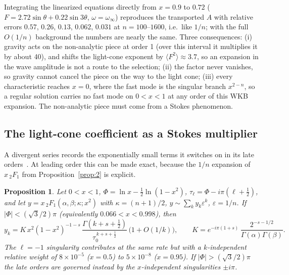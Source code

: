 \documentclass[aps,prd,onecolumn,superscriptaddress,nofootinbib,10pt]{revtex4-2}
\newcommand{\eps}{\varepsilon}
\newtheorem{proposition}{Proposition}
\begin{document}
Integrating the linearized equations directly from $x = 0.9$ to $0.72$ ($F = 2.72\sin\theta + 0.22\sin3\theta$,
$\omega = \omega_\infty$) reproduces the transported $A$ with relative errors $0.57$, $0.26$, $0.13$, $0.062$, $0.031$ at
$n = 100$--$1600$, i.e.\ like $1/n$; with the full $O(1/n)$ background the numbers are nearly the same. Three
consequences: (i) gravity acts on the non-analytic piece at order 1 (over this interval it multiplies it by about 40),
and shifts the light-cone exponent by $\langle F^2\rangle \approx 3.7$, so an expansion in the wave amplitude is not a route
to the selection; (ii) the factor never vanishes, so gravity cannot cancel the piece on the way to the light cone;
(iii) every characteristic reaches $x = 0$, where the fast mode is the singular branch $x^{2-n}$, so a regular solution
carries no fast mode on $0 < x < 1$ at any order of this WKB expansion. The non-analytic piece must come from a Stokes
phenomenon.

\subsection{The light-cone coefficient as a Stokes multiplier}

A divergent series records the exponentially small terms it switches on in its late orders~\cite{Dingle1973}. At
leading order this can be made exact, because the $1/n$ expansion of $x\,{}_2F_1$ from Proposition~\ref{prop:2} is
explicit.

\begin{proposition}\label{prop:4}
Let $0 < x < 1$, $\Phi = \ln x - \tfrac12\ln(1-x^2)$, $\tau_\ell = \Phi - i\pi(\ell + \tfrac12)$, and let
$y = x\,{}_2F_1(\alpha,\beta;\kappa;x^2)$ with $\kappa = (n+1)/2$, $y \sim \sum_k y_k\eps^k$, $\eps = 1/n$. If
$|\Phi| < (\sqrt3/2)\pi$ (equivalently $0.066 < x < 0.998$), then
\begin{equation}
y_k = K\,x^2(1-x^2)^{-1-s}\,\frac{\Gamma(k+s+\frac12)}{\tau_0^{\,k+s+\frac12}}\,\big(1 + O(1/k)\big), \qquad
K = e^{-i\pi(1+s)}\,\frac{2^{-s-1/2}}{\Gamma(\alpha)\Gamma(\beta)} .
\label{eq:prop4}
\end{equation}
The $\ell = -1$ singularity contributes at the same rate but with a $k$-independent relative weight of $8\times10^{-5}$
($x = 0.5$) to $5\times10^{-8}$ ($x = 0.95$). If $|\Phi| > (\sqrt3/2)\pi$ the late orders are governed instead by the
$x$-independent singularities $\pm i\pi$.
\end{proposition}
\end{document}
